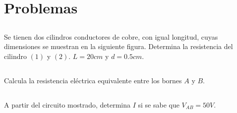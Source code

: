 \documentclass[../main.tex]{subfiles}
\begin{document}
\section{Problemas}%
\label{sec:problemas}


\thispagestyle{fancy}

\setcounter{subsection}{4}
\subsection{}%
Se tienen dos cilindros conductores de cobre, con igual longitud, cuyas
dimensiones se muestran en la siguiente figura.
Determina la resistencia del cilindro $(1)$ y $(2)$.
$L=20cm$ y $d=0.5cm$.

\setcounter{subsection}{6}
\subsection{}%

Calcula la resistencia eléctrica equivalente entre los bornes $A$ y $B$.

\setcounter{subsection}{15}
\subsection{}%

A partir del circuito mostrado, determina $I$ si se sabe que $V_{AB}=50V$.
\end{document}
